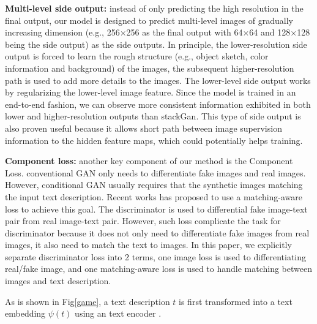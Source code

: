 \documentclass[10pt,twocolumn,letterpaper]{article}
\begin{document}
\textbf{Multi-level side output:} instead of only predicting the high resolution in the final output, our model is designed to predict multi-level images of gradually increasing dimension (e.g., 256$\times$256 as the final output with 64$\times$64 and 128$\times$128 being the side output) as the side outputs. In principle, the lower-resolution side output is forced to learn the rough structure (e.g., object sketch, color information and background) of the images, the subsequent higher-resolution path is used to add more details to the images. The lower-level side output works by regularizing the lower-level image feature. Since the model is trained in an end-to-end fashion, we can observe more consistent information exhibited in both lower and higher-resolution outputs than stackGan\cite{han2017stackgan}. This type of side output is also proven useful because it allows short path between image supervision information to the hidden feature maps, which could potentially helps training.

\textbf{Component loss: } another  key component of our method is the Component Loss. conventional GAN only needs to differentiate fake images and real images. However, conditional GAN usually requires that the synthetic images matching  the input text description. 
Recent works\cite{han2017stackgan,reed2016generative} has proposed to use a matching-aware loss to achieve this goal. The discriminator is used to differential fake image-text pair from real image-text pair. However, such loss complicate the task for discriminator because it does not only need to differentiate fake images from real images, it also need to match the text to images.
In this paper, we explicitly separate discriminator loss into 2 terms, one image loss is used to differentiating real/fake image, and 
one matching-aware loss is used to handle matching between images and text description. 


As is shown in Fig\ref{game}, a text description $t$ is first transformed into a text embedding $\psi(t)$ using an text encoder \cite{reed2016generative}. 
\end{document}
